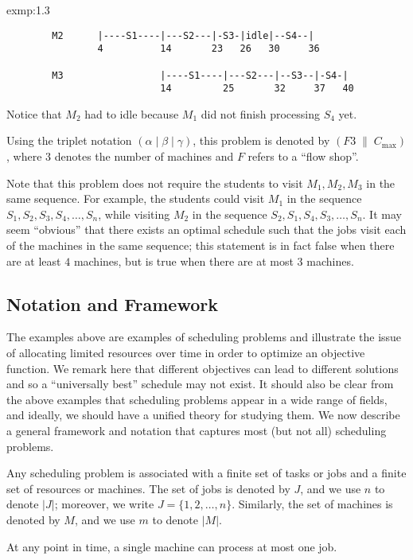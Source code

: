 \begin{exmp}{exmp:1.3}
\begin{verbatim}
        M2      |----S1----|---S2---|-S3-|idle|--S4--|
                4          14       23   26   30     36

        M3                 |----S1----|---S2---|--S3--|-S4-|
                           14         25       32     37   40 
    \end{verbatim} 
    \vspace{-1em}
    Notice that $M_2$ had to idle because $M_1$ did not finish processing 
    $S_4$ yet. 
    
    Using the triplet notation $(\alpha \mid \beta \mid \gamma)$, 
    this problem is denoted by $(F3\;\|\;C_{\max})$, where $3$ denotes 
    the number of machines and $F$ refers to a ``flow shop''.

    Note that this problem does not require the students to visit $M_1, 
    M_2, M_3$ in the same sequence. For example, the students could 
    visit $M_1$ in the sequence $S_1, S_2, S_3, S_4, \dots, S_n$, while visiting 
    $M_2$ in the sequence $S_2, S_1, S_4, S_3, \dots, S_n$. It may seem 
    ``obvious'' that there exists an optimal schedule such that the jobs 
    visit each of the machines in the same sequence; this statement is 
    in fact false when there are at least $4$ machines, but is true when 
    there are at most $3$ machines. 
\end{exmp}

\subsection{Notation and Framework}\label{subsec:1.2}
The examples above are examples of scheduling problems and illustrate the 
issue of allocating limited resources over time in order to optimize an 
objective function. We remark here that different objectives can lead to 
different solutions and so a ``universally best'' schedule may not exist. 
It should also be clear from the above examples that scheduling problems
appear in a wide range of fields, and ideally, we should have a unified theory 
for studying them. We now describe a general framework and notation that 
captures most (but not all) scheduling problems.

Any scheduling problem is associated with a finite set of tasks or jobs and 
a finite set of resources or machines. The set of jobs is denoted by $J$, 
and we use $n$ to denote $|J|$; moreover, we write $J = \{1, 2, \dots, n\}$. 
Similarly, the set of machines is denoted by $M$, and we use $m$ to denote $|M|$.

At any point in time, a single machine can process at most one job. 

